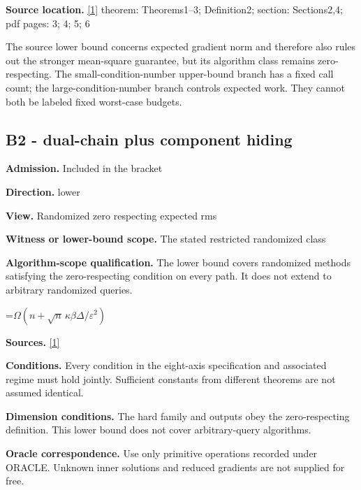 \documentclass[10pt,a4paper]{article}
\newcommand{\AtlasMath}[1]{\par\begingroup\centering\setbox0=\hbox{$\displaystyle #1$}\ifdim\wd0>1.4\linewidth\typeout{ATLAS WIDE FORMULA: \the\wd0}\fi\ifdim\wd0>\linewidth\resizebox{\linewidth}{!}{\box0}\else\box0\fi\par\endgroup}
\begin{document}
\textbf{Source location.} \href{https://arxiv.org/pdf/2610.04944v1}{[1]} theorem: Theorems1--3; Definition2; section: Sections2,4; pdf pages: 3; 4; 5; 6



The source lower bound concerns expected gradient norm and therefore also rules out the stronger mean-square guarantee, but its algorithm class remains zero-respecting. The small-condition-number upper-bound branch has a fixed call count; the large-condition-number branch controls expected work. They cannot both be labeled fixed worst-case budgets.



\subsection{B2 - dual-chain plus component hiding}


\textbf{Admission.} Included in the bracket



\textbf{Direction.} lower



\textbf{View.} Randomized zero respecting expected rms



\textbf{Witness or lower-bound scope.} The stated restricted randomized class



\textbf{Algorithm-scope qualification.} The lower bound covers randomized methods satisfying the zero-respecting condition on every path. It does not extend to arbitrary randomized queries.



\AtlasMath{\Omega(n+\sqrt n\,\kappa\beta\Delta/\varepsilon^2)}


\textbf{Sources.} \href{https://arxiv.org/pdf/2610.04944v1}{[1]}



\textbf{Conditions.} Every condition in the eight-axis specification and associated regime must hold jointly. Sufficient constants from different theorems are not assumed identical.



\textbf{Dimension conditions.} The hard family and outputs obey the zero-respecting definition. This lower bound does not cover arbitrary-query algorithms.



\textbf{Oracle correspondence.} Use only primitive operations recorded under ORACLE. Unknown inner solutions and reduced gradients are not supplied for free.
\end{document}
